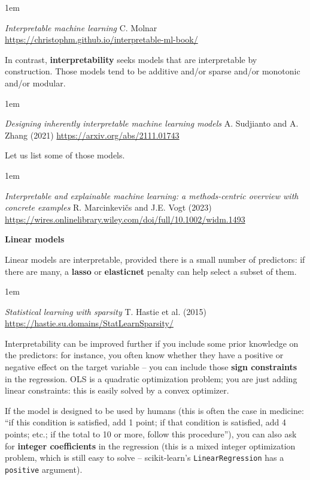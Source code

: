 \documentclass[a5paper]{article}
\let\d\textbf
\newenvironment{reference}{%
  \medskip\goodbreak
  \parskip 0pt
  \raggedright
  \leftskip 1em
  \obeylines
}{\par\medskip\goodbreak}
\def\subsection#1{{\par\bigskip\goodbreak\large\bfseries #1\par}}
\begin{document}
\begin{reference}
  \emph{Interpretable machine learning}
  C. Molnar 
  \url{https://christophm.github.io/interpretable-ml-book/}
\end{reference}

In contrast, \d{interpretability} seeks models that are interpretable by construction.
Those models tend to be additive and/or sparse and/or monotonic and/or modular.

\begin{reference}
  \emph{Designing inherently interpretable machine learning models}
  A. Sudjianto and A. Zhang (2021)
  \url{https://arxiv.org/abs/2111.01743}
\end{reference}

Let us list some of those models.

\begin{reference}
  \emph{Interpretable and explainable machine learning: a methods-centric overview with concrete examples}
  R. Marcinkevičs and J.E. Vogt (2023)
  \url{https://wires.onlinelibrary.wiley.com/doi/full/10.1002/widm.1493}
\end{reference}

\subsection{Linear models}
  
Linear models are interpretable, provided there is a small number of predictors:
if there are many, a \d{lasso} or \d{elasticnet} penalty can help select a subset of them.

\begin{reference}
  \emph{Statistical learning with sparsity}
  T. Hastie et al. (2015)
  \url{https://hastie.su.domains/StatLearnSparsity/}
\end{reference}

Interpretability can be improved further if you include some prior knowledge
on the predictors: for instance, you often know whether they have a positive or
negative effect on the target variable -- you can include those \d{sign constraints}
in the regression. OLS is a quadratic optimization problem; you are just adding
linear constraints: this is easily solved by a convex optimizer.

If the model is designed to be used by humans
(this is often the case in medicine: ``if this condition is satisfied, add 1 point;
if that condition is satisfied, add 4 points; etc.; if the total to 10 or more,
follow this procedure''), you can also ask for \d{integer coefficients} in the regression
(this is a mixed integer optimization problem, which is still easy to solve --
scikit-learn's \texttt{LinearRegression} has a \texttt{positive} argument).
\end{document}
